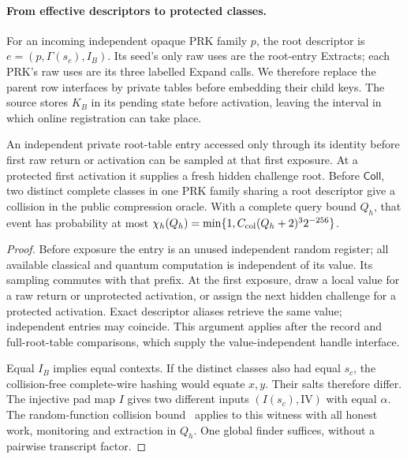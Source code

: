 \paragraph{From effective descriptors to protected classes.}
For an incoming independent opaque PRK family $p$, the root descriptor
is $e=(p,\Gamma(s_c),I_B)$. Its seed's only raw uses are the root-entry
Extracts; each PRK's raw uses are its
three labelled Expand calls. We therefore replace the parent row
interfaces by private tables before embedding their child keys. The
source stores $K_B$ in its pending state before activation, leaving
the interval in which online registration can take place.

\begin{lemma}
\label{lem:bootstrap-deferred}
An independent private root-table entry accessed only through its
identity before first raw return or activation can be sampled at that
first exposure. At a protected first activation it supplies a fresh
hidden challenge root. Before $\mathsf{Coll}$, two distinct complete
classes in one PRK family sharing a root descriptor give a collision
in the public compression oracle. With a complete query bound $Q_h$,
that event has probability at most
$\chi_h(Q_h)=\min\{1,C_{\rm col}(Q_h+2)^3 2^{-256}\}$.
\end{lemma}
\begin{proof}
Before exposure the entry is an unused independent random register;
all available classical and quantum computation is independent of its
value. Its sampling commutes with that prefix. At the first exposure,
draw a local value for a raw return or unprotected activation, or assign
the next hidden challenge for a protected activation. Exact descriptor
aliases retrieve the same value; independent entries may coincide.
This argument applies after the record and full-root-table comparisons,
which supply the value-independent handle interface.

Equal $I_B$ implies equal contexts. If the distinct classes also had
equal $s_c$, the collision-free complete-wire hashing would equate
$x,y$. Their salts therefore differ. The injective pad map $I$ gives
two different inputs $(I(s_c),\mathrm{IV})$ with equal $\alpha$.
The random-function collision bound~\cite[Theorem~7]{zhandryCollision2015}
applies to this witness with all honest work, monitoring and extraction
in $Q_h$. One global finder suffices, without a pairwise transcript factor.
\end{proof}

